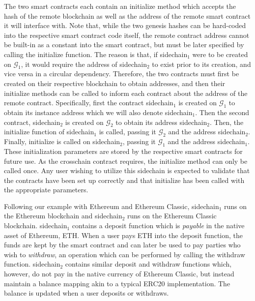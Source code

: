 The two smart contracts each contain an \textsf{initialize} method which accepts
the hash of the remote blockchain as well as the address of the remote smart
contract it will interface with. Note that, while the two genesis hashes can be
hard-coded into the respective smart contract code itself, the remote contract
address cannot be built-in as a constant into the smart contract, but must be
later specified by calling the \textsf{initialize} function. The reason is that,
if \textsf{sidechain}$_1$ were to be created on $\mathcal{G}_1$, it would
require the address of \textsf{sidechain}$_2$ to exist prior to its creation,
and vice versa in a circular dependency. Therefore, the two contracts must first
be created on their respective blockchain to obtain addresses, and then their
\textsf{initialize} methods can be called to inform each contract about the
address of the remote contract. Specifically, first the contract
\textsf{sidechain}$_1$ is created on $\mathcal{G}_1$ to obtain its instance
address which we will also denote \textsf{sidechain}$_1$. Then the second
contract, \textsf{sidechain}$_2$ is created on $\mathcal{G}_2$ to obtain its
address \textsf{sidechain}$_2$. Then, the \textsf{initialize} function of
\textsf{sidechain}$_1$ is called, passing it $\mathcal{G}_2$ and the address
\textsf{sidechain}$_2$. Finally, \textsf{initialize} is called on
\textsf{sidechain}$_2$, passing it $\mathcal{G}_1$ and the address
\textsf{sidechain}$_1$. These initialization parameters are stored by the
respective smart contracts for future use. As the \textsf{crosschain} contract
requires, the \textsf{initialize} method can only be called once. Any user
wishing to utilize this sidechain is expected to validate that the contracts
have been set up correctly and that \textsf{initialize} has been called with the
appropriate parameters.

Following our example with Ethereum and Ethereum Classic, \textsf{sidechain}$_1$
runs on the Ethereum blockchain and \textsf{sidechain}$_2$ runs on the Ethereum
Classic blockchain. \textsf{sidechain}$_1$ contains a \textsf{deposit} function
which is \emph{payable} in the native asset of Ethereum, ETH. When a user pays
ETH into the \textsf{deposit} function, the funds are kept by the smart contract
and can later be used to pay parties who wish to \emph{withdraw}, an operation
which can be performed by calling the \textsf{withdraw} function.
\textsf{sidechain}$_2$ contains similar \textsf{deposit} and \textsf{withdraw}
functions which, however, do not pay in the native currency of Ethereum Classic,
but instead maintain a \textsf{balance} mapping akin to a typical ERC20
implementation. The balance is updated when a user deposits or withdraws.

